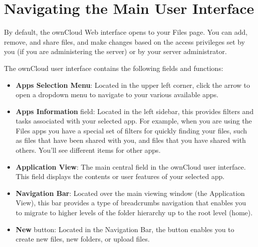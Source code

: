 \documentclass[letterpaper,10pt,english]{sphinxmanual}
\begin{document}
\section{Navigating the Main User Interface}
\label{webinterface:navigating-the-main-user-interface}
By default, the ownCloud Web interface opens to your Files page. You can add,
remove, and share files, and make changes based on the access privileges set by
you (if you are administering the server) or by your server administrator.
\begin{figure}[htbp]
\centering

\end{figure}

The ownCloud user interface contains the following fields and functions:
\begin{itemize}
\item {} 
\textbf{Apps Selection Menu}: Located in the upper left corner, click the arrow to
open a dropdown menu to navigate to your various available apps.

\item {} 
\textbf{Apps Information} field: Located in the left sidebar, this provides
filters and tasks associated with your selected app.  For example, when you
are using the Files apps you have a special set of filters for quickly
finding your files, such as files that have been shared with you, and files
that you have shared with others. You'll see different items for other apps.

\item {} 
\textbf{Application View}: The main central field in the ownCloud user interface.
This field displays the contents or user features of your selected app.

\item {} 
\textbf{Navigation Bar}: Located over the main viewing window (the Application
View), this bar provides a type of breadcrumbs navigation that enables you to
migrate to higher levels of the folder hierarchy up to the root level (home).

\item {} 
\textbf{New} button: Located in the Navigation Bar, the  button
enables you to create new files, new folders, or upload files.

\end{itemize}
\end{document}
